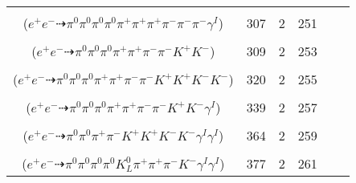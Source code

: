 \documentclass[landscape]{article}
\newcounter{rownumbers}
\newcommand\rn{\stepcounter{rownumbers}\arabic{rownumbers}}
\newcommand{\EOL}{\\} %
\newcommand{\topoTags}[1]{#1} %
\begin{document}
\begin{longtable}{clcccc}
\rn & \makecell[l]{ $ 
e^{+} e^{-} \rightarrow \pi^{0} \pi^{0} \pi^{+} \pi^{-} \pi^{-} \rho^{+} \omega \gamma^{I} ,
\rho^{+} \rightarrow \pi^{0} \pi^{+} ,
\omega \rightarrow \pi^{0} \pi^{+} \pi^{-} 
$ \\ ($
e^{+} e^{-} \dashrightarrow \pi^{0} \pi^{0} \pi^{0} \pi^{0} \pi^{+} \pi^{+} \pi^{+} \pi^{-} \pi^{-} \pi^{-} \gamma^{I} 
$) } & \topoTags{307 & }2 & 251 \EOL

\rn & \makecell[l]{ $ 
e^{+} e^{-} \rightarrow \pi^{0} \pi^{+} \pi^{-} \pi^{-} \rho^{+} K^{+} K^{*-} ,
\rho^{+} \rightarrow \pi^{0} \pi^{+} ,
K^{*-} \rightarrow \pi^{0} K^{-} 
$ \\ ($
e^{+} e^{-} \dashrightarrow \pi^{0} \pi^{0} \pi^{0} \pi^{+} \pi^{+} \pi^{-} \pi^{-} K^{+} K^{-} 
$) } & \topoTags{309 & }2 & 253 \EOL

\rn & \makecell[l]{ $ 
e^{+} e^{-} \rightarrow \pi^{0} \pi^{0} \pi^{+} \pi^{-} K^{*} \bar{K}^{*} K^{-} K^{*+} ,
K^{*} \rightarrow \pi^{-} K^{+} ,
\bar{K}^{*} \rightarrow \pi^{+} K^{-} ,
K^{*+} \rightarrow \pi^{0} K^{+} 
$ \\ ($
e^{+} e^{-} \dashrightarrow \pi^{0} \pi^{0} \pi^{0} \pi^{+} \pi^{+} \pi^{-} \pi^{-} K^{+} K^{+} K^{-} K^{-} 
$) } & \topoTags{320 & }2 & 255 \EOL

\rn & \makecell[l]{ $ 
e^{+} e^{-} \rightarrow \pi^{0} \pi^{0} \pi^{+} \pi^{-} \rho^{+} K^{*} K^{-} \gamma^{I} ,
\rho^{+} \rightarrow \pi^{0} \pi^{+} ,
K^{*} \rightarrow \pi^{-} K^{+} 
$ \\ ($
e^{+} e^{-} \dashrightarrow \pi^{0} \pi^{0} \pi^{0} \pi^{+} \pi^{+} \pi^{-} \pi^{-} K^{+} K^{-} \gamma^{I} 
$) } & \topoTags{339 & }2 & 257 \EOL

\rn & \makecell[l]{ $ 
e^{+} e^{-} \rightarrow \pi^{0} \pi^{+} \rho^{-} K^{+} K^{+} K^{-} K^{-} \gamma^{I} \gamma^{I} ,
\rho^{-} \rightarrow \pi^{0} \pi^{-} 
$ \\ ($
e^{+} e^{-} \dashrightarrow \pi^{0} \pi^{0} \pi^{+} \pi^{-} K^{+} K^{+} K^{-} K^{-} \gamma^{I} \gamma^{I} 
$) } & \topoTags{364 & }2 & 259 \EOL

\rn & \makecell[l]{ $ 
e^{+} e^{-} \rightarrow \pi^{0} \pi^{0} \pi^{+} \rho^{+} \rho^{-} K^{0} K^{-} \gamma^{I} \gamma^{I} ,
\rho^{+} \rightarrow \pi^{0} \pi^{+} ,
\rho^{-} \rightarrow \pi^{0} \pi^{-} ,
K^{0} \rightarrow K_{L}^{0} 
$ \\ ($
e^{+} e^{-} \dashrightarrow \pi^{0} \pi^{0} \pi^{0} \pi^{0} K_{L}^{0} \pi^{+} \pi^{+} \pi^{-} K^{-} \gamma^{I} \gamma^{I} 
$) } & \topoTags{377 & }2 & 261 \EOL


\end{longtable}
\end{document}
